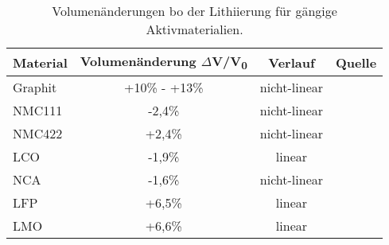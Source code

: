 \begin{table}[ht]
    \centering
    \caption{\label{tab:volume_change}Volumenänderungen bo der Lithiierung für gängige Aktivmaterialien.}
    \begin{tabular}[t]{lccc}
        \toprule
        Material& Volumenänderung $\Delta$V/V\textsubscript{0}&Verlauf&Quelle\\
        \midrule
        Graphit & +10\% - +13\% & nicht-linear & \cite{Qi2010,Woodford2012}\\
        NMC111 &-2,4\%&nicht-linear& \cite{Yabuuchi2005}\\
        NMC422 &+2,4\%&nicht-linear& \cite{Ma2007}\\
        LCO &-1,9\% & linear & \cite{Reimers1992}\\
        NCA &-1,6\% & nicht-linear& \cite{Itou2005}\\
        LFP &+6,5\% & linear & \cite{Padhi1997}\\
        LMO &+6,6\% & linear & \cite{Christensen2006}\\
        \bottomrule
    \end{tabular}
\end{table}